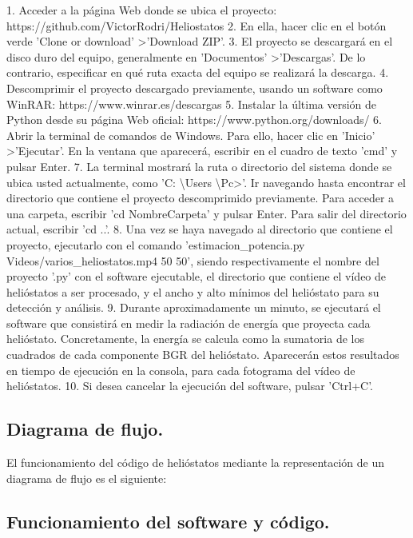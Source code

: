 1. Acceder a la página Web donde se ubica el proyecto: https://github.com/VictorRodri/Heliostatos
2. En ella, hacer clic en el botón verde 'Clone or download' \textgreater 'Download ZIP'.
3. El proyecto se descargará en el disco duro del equipo, generalmente en 'Documentos' \textgreater 'Descargas'. De lo contrario, especificar en qué ruta exacta del equipo se realizará la descarga.
4. Descomprimir el proyecto descargado previamente, usando un software como WinRAR: https://www.winrar.es/descargas
5. Instalar la última versión de Python desde su página Web oficial: https://www.python.org/downloads/
6. Abrir la terminal de comandos de Windows. Para ello, hacer clic en 'Inicio' \textgreater 'Ejecutar'. En la ventana que aparecerá, escribir en el cuadro de texto 'cmd' y pulsar Enter.
7. La terminal mostrará la ruta o directorio del sistema donde se ubica usted actualmente, como 'C: \textbackslash Users \textbackslash Pc\textgreater'. Ir navegando hasta encontrar el directorio que contiene el proyecto descomprimido previamente. Para acceder a una carpeta, escribir 'cd NombreCarpeta' y pulsar Enter. Para salir del directorio actual, escribir 'cd ..'.
8. Una vez se haya navegado al directorio que contiene el proyecto, ejecutarlo con el comando 'estimacion\_potencia.py Videos/varios\_heliostatos.mp4 50 50', siendo respectivamente el nombre del proyecto '.py' con el software ejecutable, el directorio que contiene el vídeo de helióstatos a ser procesado, y el ancho y alto mínimos del helióstato para su detección y análisis.
9. Durante aproximadamente un minuto, se ejecutará el software que consistirá en medir la radiación de energía que proyecta cada helióstato. Concretamente, la energía se calcula como la sumatoria de los cuadrados de cada componente BGR del helióstato. Aparecerán estos resultados en tiempo de ejecución en la consola, para cada fotograma del vídeo de helióstatos.
10. Si desea cancelar la ejecución del software, pulsar 'Ctrl+C'.

\subsection{Diagrama de flujo.}

El funcionamiento del código de helióstatos mediante la representación de un diagrama de flujo es el siguiente:

\subsection{Funcionamiento del software y código.}

